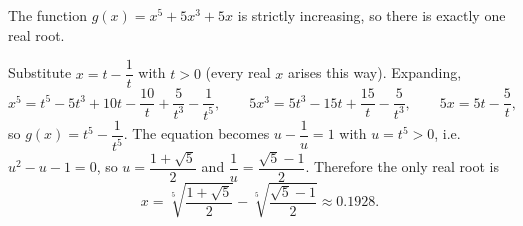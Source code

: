 The function $g(x)=x^5+5x^3+5x$ is strictly increasing, so there is exactly one real root.

Substitute $x=t-\dfrac1t$ with $t>0$ (every real $x$ arises this way). Expanding,
\[x^5=t^5-5t^3+10t-\dfrac{10}t+\dfrac5{t^3}-\dfrac1{t^5},\qquad5x^3=5t^3-15t+\dfrac{15}t-\dfrac5{t^3},\qquad5x=5t-\dfrac5t,\]
so $g(x)=t^5-\dfrac1{t^5}$. The equation becomes $u-\dfrac1u=1$ with $u=t^5>0$, i.e. $u^2-u-1=0$, so $u=\dfrac{1+\sqrt5}2$ and $\dfrac1u=\dfrac{\sqrt5-1}2$. Therefore the only real root is
\[x=\boxed{\sqrt[5]{\dfrac{1+\sqrt5}{2}}-\sqrt[5]{\dfrac{\sqrt5-1}{2}}}\approx0.1928.\]
